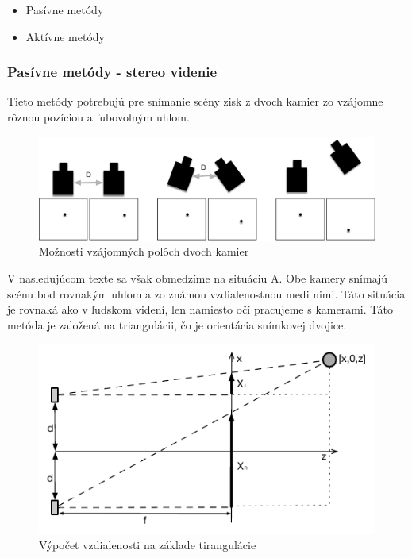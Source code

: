 \begin{itemize}
\item Pasívne metódy
\item Aktívne metódy 
\end{itemize}

\subsubsection{Pasívne metódy - stereo videnie}
Tieto metódy potrebujú pre snímanie scény zisk z dvoch kamier zo vzájomne rôznou pozíciou a ľubovolným uhlom. 

\begin{figure}[H]
\begin{center}
	\includegraphics[scale=0.5]{obrazky/poloha_kamier_3D}
	\caption{Možnosti vzájomných polôch dvoch kamier}
	\end{center}
\end{figure}


V nasledujúcom texte sa však obmedzíme na situáciu A. Obe kamery snímajú scénu bod rovnakým uhlom a zo známou vzdialenostnou medi nimi. Táto situácia je rovnaká ako v ľudskom videní, len namiesto očí pracujeme s kamerami. Táto metóda je založená na triangulácii, čo je orientácia snímkovej dvojice. 

\begin{figure}[H]
\begin{center}
	\includegraphics[scale=1.8]{obrazky/triangulacia}
	\caption{Výpočet vzdialenosti na základe tirangulácie}
	\end{center}
\end{figure}

